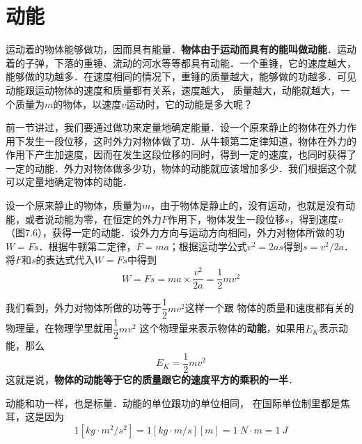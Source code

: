 \section{动能}
运动着的物体能够做功，因而具有能量．\textbf{物体由于运动而具有的能叫做动能}．运动着的子弹，下落的重锤、流动的河水等等都具有动能．一个重锤，它的速度越大，能够做的功越多．在速度相同的情况下，重锤的质量越大，能够做的功越多．可见动能跟运动物体的速度和质量都有关系，速度越大，
质量越大，动能就越大，一个质量为$m$的物体，以速度$v$运动时，它的动能是多大呢？

前一节讲过，我们要通过做功来定量地确定能量．设一个原来静止的物体在外力作用下发生一段位移，这时外力对物体做了功．从牛顿第二定律知道，物体在外力的作用下产生加速度，因而在发生这段位移的同时，得到一定的速度，也同时获得了一定的动能．外力对物体做多少功，物体的动能就应该增加多少．我们根据这个就可以定量地确定物体的动能．

\begin{figure}[H]
    \centering
    \caption{}
\end{figure}

设一个原来静止的物体，质量为$m$，由于物体是静止的，没有运动，也就是没有动能，或者说动能为零，在恒定的外力$F$作用下，物体发生一段位移$s$，得到速度$v$（图7.6），获得一定的动能．设外力方向与运动方向相同，外力对物体所做的功$W=Fs$．根据牛顿第二定律，$F=ma$；根据运动学公式$v^2=2as$得到$s=v^2/2a$．将$F$和$s$的表达式代入$W=Fs$中得到
\[W=Fs=ma\times \frac{v^2}{2a}=\frac{1}{2}mv^2 \]

我们看到，外力对物体所做的功等于$\dfrac{1}{2}mv^2$这样一个跟
物体的质量和速度都有关的物理量，在物理学里就用$\dfrac{1}{2}mv^2$
这个物理量来表示物体的\textbf{动能}，如果用$E_K$表示动能，那么
\[E_K=\frac{1}{2}mv^2 \]
这就是说，\textbf{物体的动能等于它的质量跟它的速度平方的乘积的一半}．

动能和功一样，也是标量．动能的单位跟功的单位相同，
在国际单位制里都是焦耳，这是因为
\[1[\unit{{ kg}\cdot { m^2}/{ s^2}}]=1[\unit{{ kg}\cdot \si{m/s}}][{ m}]=\qty{1}{N\cdot m}=\qty{1}{J}\]


